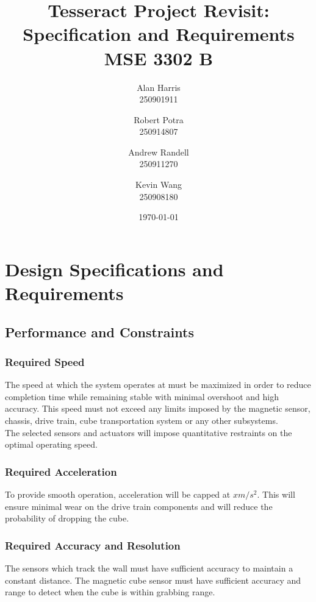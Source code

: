 \documentclass[12pt]{article}
\begin{document}
\title{\textbf{Tesseract Project Revisit:\\Specification and Requirements\\ MSE 3302 B}}
\author{
  Alan Harris\\
  250901911
  \and
  Robert Potra\\
  250914807
  \and
  Andrew Randell\\
  250911270
  \and
  Kevin Wang\\
  250908180
}
\date{\today}
\maketitle

\tableofcontents
\thispagestyle{empty}

\pagebreak
\setcounter{page}{1}
 
\section{Design Specifications and Requirements}
\subsection{Performance and Constraints}
\subsubsection{Required Speed}
The speed at which the system operates at must be maximized in order to reduce completion time while remaining stable with minimal overshoot and high accuracy. This speed must not exceed any limits imposed by the magnetic sensor, chassis, drive train, cube transportation system or any other subsystems. \\

The selected sensors and actuators will impose quantitative restraints on the optimal operating speed.

\subsubsection{Required Acceleration}
To provide smooth operation, acceleration will be capped at $x m/s^2$. This will ensure minimal wear on the drive train components and will reduce the probability of dropping the cube.
\subsubsection{Required Accuracy and Resolution}
The sensors which track the wall must have sufficient accuracy to maintain a constant distance. The magnetic cube sensor must have sufficient accuracy and range to detect when the cube is within grabbing range.
\end{document}
